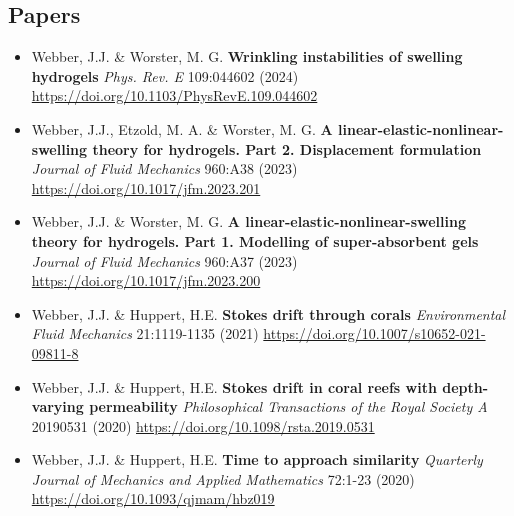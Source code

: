 \documentclass[a4paper]{article}
\begin{document}
    \begin{multicols}{2}
        \subsection*{Papers}
            \begin{small}
                \begin{itemize}
                    \item Webber, J.J. \& Worster, M. G. \textbf{Wrinkling instabilities of swelling hydrogels} \emph{Phys. Rev. E} 109:044602 (2024) \href{https://doi.org/10.1103/PhysRevE.109.044602}{https://doi.org/10.1103/PhysRevE.109.044602}
                    \item Webber, J.J., Etzold, M. A. \& Worster, M. G. \textbf{A linear-elastic-nonlinear-swelling theory for hydrogels. Part 2. Displacement formulation} \emph{Journal of Fluid Mechanics} 960:A38 (2023) \href{https://doi.org/10.1017/jfm.2023.201}{https://doi.org/10.1017/jfm.2023.201}
                    \item Webber, J.J. \& Worster, M. G. \textbf{A linear-elastic-nonlinear-swelling theory for hydrogels. Part 1. Modelling of super-absorbent gels} \emph{Journal of Fluid Mechanics} 960:A37 (2023) \href{https://doi.org/10.1017/jfm.2023.200}{https://doi.org/10.1017/jfm.2023.200}
                    \item Webber, J.J. \& Huppert, H.E. \textbf{Stokes drift through corals} \emph{Environmental Fluid Mechanics} 21:1119-1135 (2021) \href{https://doi.org/10.1007/s10652-021-09811-8}{https://doi.org/10.1007/s10652-021-09811-8}
                    \item Webber, J.J. \& Huppert, H.E. \textbf{Stokes drift in coral reefs with depth-varying permeability} \emph{Philosophical Transactions of the Royal Society A} 20190531 (2020) \href{https://doi.org/10.1098/rsta.2019.0531}{https://doi.org/10.1098/rsta.2019.0531}
                    \item Webber, J.J. \& Huppert, H.E. \textbf{Time to approach similarity} \emph{Quarterly Journal of Mechanics and Applied Mathematics} 72:1-23 (2020) \href{https://doi.org/10.1093/qjmam/hbz019}{https://doi.org/10.1093/qjmam/hbz019}
                \end{itemize}
            \end{small}
        

\end{multicols}
\end{document}
